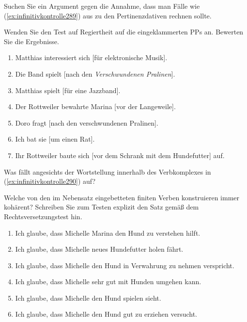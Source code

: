  \label{exc:relationenundpraedikate05} Suchen Sie ein Argument gegen die Annahme, dass man Fälle wie (\ref{ex:infinitivkontrolle289}) aus \citet[299]{Eisenberg2013b} zu den Pertinenzdativen rechnen sollte.

\begin{exe}
\end{exe}

 \label{exc:relationenundpraedikate06} Wenden Sie den Test auf Regiertheit auf die eingeklammerten PPs an.
Bewerten Sie die Ergebnisse.

\begin{enumerate}
  \item Matthias interessiert sich [für elektronische Musik].
  \item Die Band spielt [nach den \textit{Verschwundenen Pralinen}].
  \item Matthias spielt [für eine Jazzband].
  \item Der Rottweiler bewahrte Marina [vor der Langeweile].
  \item Doro fragt [nach den verschwundenen Pralinen].
  \item Ich bat sie [um einen Rat].
  \item Ihr Rottweiler baute sich [vor dem Schrank mit dem Hundefutter] auf.
\end{enumerate}

 \label{exc:relationenundpraedikate07} Was fällt angesichts der Wortstellung innerhalb des Verbkomplexes in (\ref{ex:infinitivkontrolle290}) auf?

\begin{exe}
\end{exe}

 \label{exc:relationenundpraedikate08} Welche von den im Nebensatz eingebetteten finiten Verben konstruieren immer kohärent?
Schreiben Sie zum Testen explizit den Satz gemäß dem Rechtsversetzungstest hin.

\begin{enumerate}
  \item Ich glaube, dass Michelle Marina den Hund zu verstehen hilft.
  \item Ich glaube, dass Michelle neues Hundefutter holen fährt.
  \item Ich glaube, dass Michelle den Hund in Verwahrung zu nehmen verspricht.
  \item Ich glaube, dass Michelle sehr gut mit Hunden umgehen kann.
  \item Ich glaube, dass Michelle den Hund spielen sieht.
  \item Ich glaube, dass Michelle den Hund gut zu erziehen versucht.
\end{enumerate}

